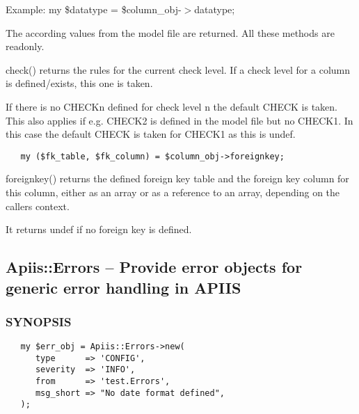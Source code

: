 Example:
   my \$datatype = \$column\_obj-$>$datatype;



The according values from the model file are returned. All these
methods are readonly.



check() returns the rules for the current check level. If a check level
for a column is defined/exists, this one is taken.



If there is no CHECKn defined for check level n the default CHECK is taken.
This also applies if e.g. CHECK2 is defined in the model file but no
CHECK1. In this case the default CHECK is taken for CHECK1 as this is
undef.

\begin{verbatim}
   my ($fk_table, $fk_column) = $column_obj->foreignkey;
\end{verbatim}


foreignkey() returns the defined foreign key table and the foreign key
column for this column, either as an array or as a
reference to an array, depending on the callers context.



It returns undef if no foreign key is defined.

\subsection{Apiis::Errors -- Provide error objects for generic error handling in APIIS\label{Apiis::Errors_--_Provide_error_objects_for_generic_error_handling_in_APIIS}}




\subsubsection*{SYNOPSIS\label{Apiis::Errors_--_Provide_error_objects_for_generic_error_handling_in_APIIS_SYNOPSIS}}
\begin{verbatim}
   my $err_obj = Apiis::Errors->new(
      type      => 'CONFIG',
      severity  => 'INFO',
      from      => 'test.Errors',
      msg_short => "No date format defined",
   );
\end{verbatim}


